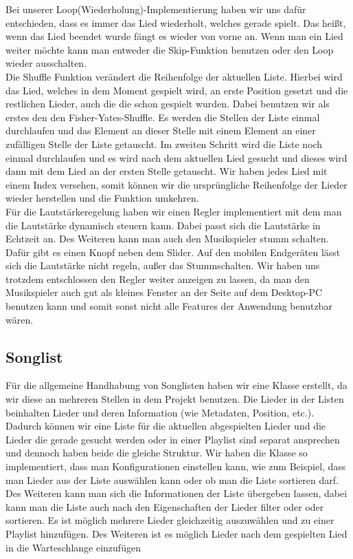 \documentclass{article}
\begin{document}
\noindent Bei unserer Loop(Wiederholung)-Implementierung haben wir uns dafür entschieden, dass es immer das Lied wiederholt, welches gerade spielt. Das heißt, wenn das Lied beendet wurde fängt es wieder von vorne an. Wenn man ein Lied weiter möchte kann man entweder die Skip-Funktion benutzen oder den Loop wieder ausschalten.\\

\noindent Die Shuffle Funktion verändert die Reihenfolge der aktuellen Liste. Hierbei wird das Lied, welches in dem Moment gespielt wird, an erste Position gesetzt und die restlichen Lieder, auch die die schon gespielt wurden. Dabei benutzen wir als erstes den den Fisher-Yates-Shuffle. Es werden die Stellen der Liste einmal durchlaufen und das Element an dieser Stelle mit einem Element an einer zufälligen Stelle der Liste getauscht. Im zweiten Schritt wird die Liste noch einmal durchlaufen und es wird nach dem aktuellen Lied gesucht und dieses wird dann mit dem Lied an der ersten Stelle getauscht. Wir haben jedes Lied mit einem Index versehen, somit können wir die ursprüngliche Reihenfolge der Lieder wieder herstellen und die Funktion umkehren.\\

\noindent Für die Lautstärkeregelung haben wir einen Regler implementiert mit dem man die Lautstärke dynamisch steuern kann. Dabei passt sich die Lautstärke in Echtzeit an. Des Weiteren kann man auch den Musikspieler stumm schalten. Dafür gibt es einen Knopf neben dem Slider. Auf den mobilen Endgeräten lässt sich die Lautstärke nicht regeln, außer das Stummschalten. Wir haben uns trotzdem entschlossen den Regler weiter anzeigen zu lassen, da man den Musikspieler auch gut als kleines Fenster an der Seite auf dem Desktop-PC benutzen kann und somit sonst nicht alle Features der Anwendung benutzbar wären.
\subsection{Songlist}
Für die allgemeine Handhabung von Songlisten haben wir eine Klasse erstellt, da wir diese an mehreren Stellen in dem Projekt benutzen. Die Lieder in der Listen beinhalten Lieder und deren Information (wie Metadaten, Position, etc.). Dadurch können wir eine Liste für die aktuellen abgespielten Lieder und die Lieder die gerade gesucht werden oder in einer Playlist sind separat ansprechen und dennoch haben beide die gleiche Struktur. Wir haben die Klasse so implementiert, dass man Konfigurationen einstellen kann, wie zum Beispiel, dass man Lieder aus der Liste auswählen kann oder ob man die Liste sortieren darf. Des Weiteren kann man sich die Informationen der Liste übergeben lassen, dabei kann man die Liste auch nach den Eigenschaften der Lieder filter oder oder sortieren. Es ist möglich mehrere Lieder gleichzeitig auszuwählen und zu einer Playlist hinzufügen. Des Weiteren ist es möglich Lieder nach dem gespielten Lied in die Warteschlange einzufügen
\end{document}
